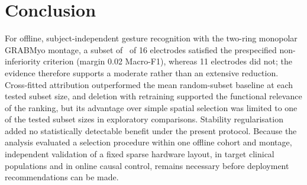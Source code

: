 \section{Conclusion}
\label{sec:conclusion}

For offline, subject-independent gesture recognition with the two-ring monopolar GRABMyo montage, a subset of \KStar\ of 16 electrodes satisfied the prespecified non-inferiority criterion (margin 0.02 Macro-F1), whereas 11 electrodes did not; the evidence therefore supports a moderate rather than an extensive reduction. Cross-fitted attribution outperformed the mean random-subset baseline at each tested subset size, and deletion with retraining supported the functional relevance of the ranking, but its advantage over simple spatial selection was limited to one of the tested subset sizes in exploratory comparisons. Stability regularisation added no statistically detectable benefit under the present protocol. Because the analysis evaluated a selection procedure within one offline cohort and montage, independent validation of a fixed sparse hardware layout, in target clinical populations and in online causal control, remains necessary before deployment recommendations can be made.
